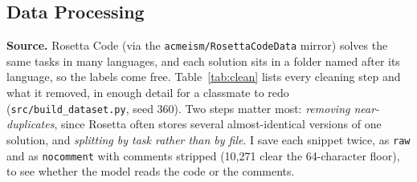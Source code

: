 \documentclass{article}
\begin{document}
\subsection{Data Processing}
\vspace{-4pt}
\textbf{Source.} Rosetta Code \citep{rosettacode} (via the \texttt{acmeism/RosettaCodeData} mirror)
solves the same tasks in many languages, and each solution sits in a folder named after its language,
so the labels come free. Table~\ref{tab:clean} lists every cleaning step and what it removed, in
enough detail for a classmate to redo (\texttt{src/build\_dataset.py}, seed 360). Two steps matter most: \emph{removing near-duplicates}, since Rosetta often stores several
almost-identical versions of one solution, and \emph{splitting by task rather than by file}. I save each snippet twice, as \texttt{raw} and as \texttt{nocomment} with comments stripped
(10{,}271 clear the 64-character floor), to see whether the model reads the code or the comments.

\begin{table}[h]
\centering\scriptsize
\caption{Cleaning pipeline and yield (step 2's three filters run together as each file is windowed,
so the running total is first well-defined at its end). Result: 10{,}360 snippets, 1{,}036 per class
(chance $=$ 10\%), from 1{,}162/249/250 \emph{tasks}.}
\label{tab:clean}
\vspace{-3pt}
\vspace{-6pt}
\end{table}
\end{document}
